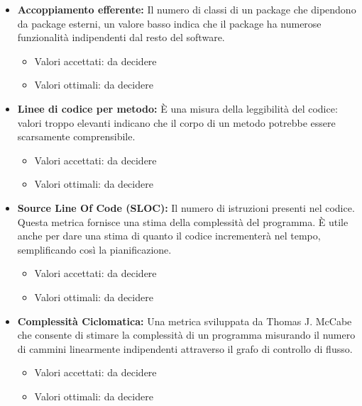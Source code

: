 \documentclass[a4paper]{article}
\begin{document}
\begin{itemize}
					\item \textbf{Accoppiamento efferente:}
						Il numero di classi di un package che dipendono da package esterni, un valore basso indica che il package ha 
						numerose funzionalità indipendenti dal resto del software.
						\begin{itemize}
							\item Valori accettati: da decidere
							\item Valori ottimali: da decidere
						\end{itemize}
						
					\item \textbf{Linee di codice per metodo:}
						È una misura della leggibilità del codice: valori troppo elevanti indicano che il corpo di un metodo
						potrebbe essere scarsamente comprensibile.
						\begin{itemize}
							\item Valori accettati: da decidere
							\item Valori ottimali: da decidere
						\end{itemize}
						
					\item \textbf{Source Line Of Code (SLOC):}
						Il numero di istruzioni presenti nel codice. Questa metrica fornisce una stima della complessità del programma.
						È utile anche per dare una stima di quanto il codice incrementerà nel tempo, semplificando così la
						pianificazione.
						\begin{itemize}
							\item Valori accettati: da decidere
							\item Valori ottimali: da decidere
						\end{itemize}
					
					\item \textbf{Complessità Ciclomatica:}
						Una metrica sviluppata da Thomas J. McCabe che consente di stimare la complessità di un programma misurando
						il numero di cammini linearmente indipendenti attraverso il grafo di controllo di flusso.
						\begin{itemize}
							\item Valori accettati: da decidere
							\item Valori ottimali: da decidere
						\end{itemize}				
			\end{itemize}
		
		
\end{document}
